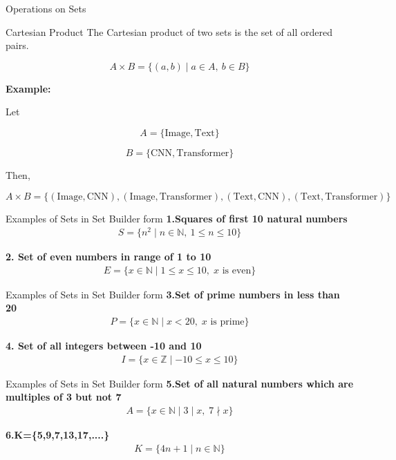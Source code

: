 \documentclass{beamer}
\begin{document}
\begin{frame}{Operations on Sets}
\begin{block}{Cartesian Product}
The Cartesian product of two sets is the set of all ordered pairs.
\end{block}
\[
A\times B=\{(a,b)\mid a\in A,\ b\in B\}
\]

\textbf{Example:}

Let

\[
A=\{\text{Image},\text{Text}\}
\]

\[
B=\{\text{CNN},\text{Transformer}\}
\]

Then,

\[
A\times B=
\{
(\text{Image},\text{CNN}),
(\text{Image},\text{Transformer}),
(\text{Text},\text{CNN}),
(\text{Text},\text{Transformer})
\}
\]

\end{frame}
\begin{frame}{Examples of Sets in Set Builder form}
    \textbf{1.Squares of first 10 natural numbers}
    \begin{gather*}
        S=\{n^2 \mid n\in\mathbb{N},\ 1\le n\le 10\}
    \end{gather*}
    
    \vspace{0.5cm}
    
    \textbf{2. Set of even numbers in range of 1 to 10}
    \begin{gather*}
        E=\{x\in\mathbb{N}\mid 1\le x\le 10,\; x\text{ is even}\}
    \end{gather*}
\end{frame}


\begin{frame}{Examples of Sets in Set Builder form}
    \textbf{3.Set of prime numbers in less than 20}
    \begin{gather*}
        P=\{x\in\mathbb{N}\mid x<20,\; x\text{ is prime}\}
    \end{gather*}
    
    \vspace{0.5cm}
    
    \textbf{4. Set of all integers between -10 and 10}
    \begin{gather*}
        I=\{x\in\mathbb{Z}\mid -10\le x\le 10\}
    \end{gather*}
\end{frame}

\begin{frame}{Examples of Sets in Set Builder form}
    \textbf{5.Set of all natural numbers which are multiples of 3 but not 7}
    \begin{gather*}
        A=\{x\in\mathbb{N}\mid 3\mid x,\; 7\nmid x\}
    \end{gather*}
    
    \vspace{0.5cm}
    
    \textbf{6.K=\{5,9,7,13,17,....\}}
    \begin{gather*}
        K=\{4n+1\mid n\in\mathbb{N}\}
    \end{gather*}
\end{frame}
\end{document}
